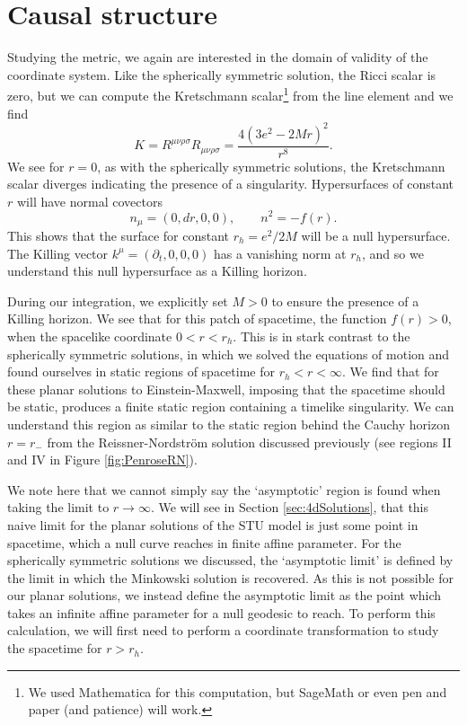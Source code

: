 \section{Causal structure}
\label{sec:emcausal}
Studying the metric, we again are interested in the domain of validity of the coordinate system. Like the spherically symmetric solution, the Ricci scalar is zero, but we can compute the Kretschmann scalar\footnote{We used Mathematica for this computation, but SageMath \cite{sagemath} or even pen and paper (and patience) will work.} from the line element and we find
\begin{equation*}
	K = R^{\mu \nu \rho \sigma} R_{\mu \nu \rho \sigma} = \frac{4 \left(3 e^2-2 M r\right)^2}{r^8}.
\end{equation*} 
We see for $r = 0$, as with the spherically symmetric solutions, the Kretschmann scalar diverges indicating the presence of a singularity. Hypersurfaces of constant $r$  will have normal covectors
\begin{equation*}
	n_\mu = (0, dr, 0, 0), \qquad n^2 = - f(r).
\end{equation*}
This shows that the surface for constant $r_h = e^2 / 2M$ will be a null hypersurface. The Killing vector $k^\mu = (\partial_t,0,0,0)$ has a vanishing norm at $r_h$, and so we understand this null hypersurface as a Killing horizon.

During our integration, we explicitly set $M > 0$ to ensure the presence of a Killing horizon. We see that for this patch of spacetime, the function $f(r) > 0$, when the spacelike coordinate $0 < r < r_h$. This is in stark contrast to the spherically symmetric solutions, in which we solved the equations of motion and found ourselves in static regions of spacetime for $r_h < r < \infty$. We find that for these planar solutions to Einstein-Maxwell, imposing that the spacetime should be static, produces a finite static region containing a timelike singularity. We can understand this region as similar to the static region behind the Cauchy horizon $r = r_-$ from the Reissner-Nordstr\"om solution discussed previously (see regions II and IV  in Figure \ref{fig:PenroseRN}).

We note here that we cannot simply say the `asymptotic' region is found when taking the limit to $r \rightarrow \infty$. We will see in Section \ref{sec:4dSolutions}, that this naive limit for the planar solutions of the STU model is just some point in spacetime, which a null curve reaches in finite affine parameter. For the spherically symmetric solutions we discussed, the `asymptotic limit' is defined by the limit in which the Minkowski solution is recovered. As this is not possible for our planar solutions, we instead define the asymptotic limit as the point which takes an infinite affine parameter for a null geodesic to reach. To perform this calculation, we will first need to perform a coordinate transformation to study the spacetime for $r > r_h$.

